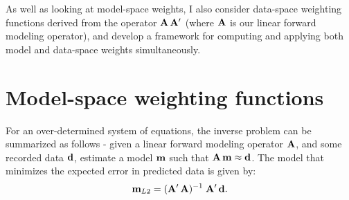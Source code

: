 \par
As well as looking at model-space weights, I also consider data-space
weighting functions derived from the operator ${\bf A}\, {\bf A}'$
(where ${\bf A}$ is our linear forward modeling operator), 
and develop a framework for computing and applying both model and
data-space weights simultaneously.  









\section{Model-space weighting functions}
For an over-determined system of equations, the inverse problem 
can be summarized as follows - given a linear 
forward modeling operator ${\bf A}$, and some recorded data ${\bf d}$,
estimate a model ${\bf m}$ such that ${\bf A} \, {\bf m}
\approx {\bf d}$.
The model that minimizes the expected error in predicted data
is given by:
\begin{equation} \label{eqn:l2eqn}
{\bf m}_{L2} = ({\bf A}'\, {\bf A})^{-1} \; {\bf A}' \, {\bf d}.
\end{equation}

